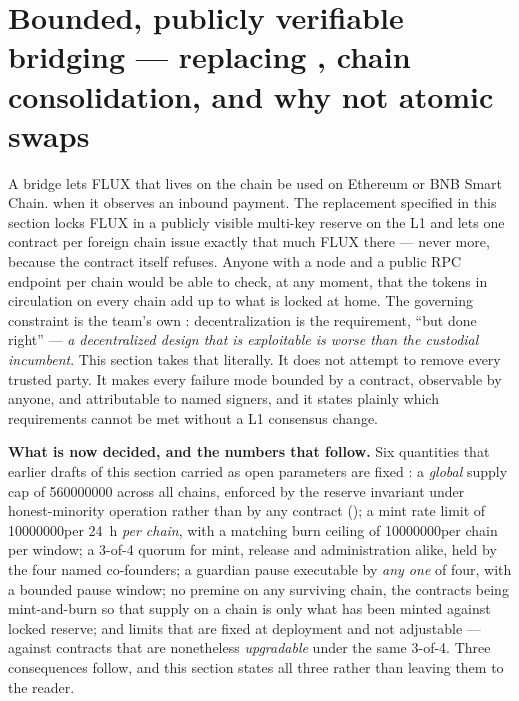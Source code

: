 \section{Bounded, publicly verifiable bridging --- replacing \Fusion, chain consolidation, and why not atomic swaps}
\label{sec:bridging}\label{sec:bridge}

A bridge lets FLUX that lives on the \Flux chain be used on Ethereum or BNB Smart Chain. 
when it observes an inbound payment. The replacement specified in this section locks FLUX in a
publicly visible multi-key reserve on the \Flux L1 and lets one contract per foreign chain issue
exactly that much FLUX there --- never more, because the contract itself refuses. Anyone with a
\Flux node and a public RPC endpoint per chain would be able to check, at any moment, that the
tokens in circulation on every chain add up to what is locked at home. The governing constraint is
the team's own : decentralization is the requirement, ``but done
right'' --- \emph{a decentralized design that is exploitable is worse than the custodial
incumbent}. This section takes that literally. It does not attempt to remove every trusted party.
It makes every failure mode bounded by a contract, observable by anyone, and attributable to named
signers, and it states plainly which requirements cannot be met without a \Flux L1 consensus
change.

\medskip
\noindent\textbf{What is now decided, and the numbers that follow.} Six quantities that earlier
drafts of this section carried as open parameters are fixed : a \emph{global} supply cap of \num{560000000}\flux{} across all chains, enforced by
the reserve invariant under honest-minority operation rather than by any contract (); a mint rate limit of \num{10000000}\flux per
\SI{24}{\hour} \emph{per chain}, with a matching burn ceiling of \num{10000000}\flux per chain per
window; a 3-of-4 quorum for mint, release and administration alike, held by the four named
co-founders; a guardian pause executable by \emph{any one} of four, with a bounded pause window; no
premine on any surviving chain, the contracts being mint-and-burn so that supply on a chain is only
what has been minted against locked reserve; and limits that are fixed at deployment and not
adjustable --- against contracts that are nonetheless \emph{upgradable} under the same 3-of-4.
Three consequences follow, and this section states all three rather than leaving them to the reader.

